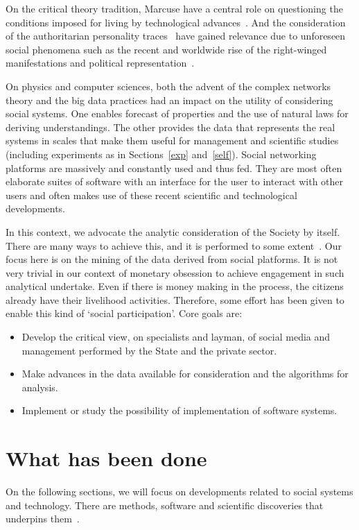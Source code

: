 \documentclass[letterpaper,10pt]{article}
\begin{document}
On the critical theory tradition,
Marcuse have a central role on
questioning the conditions
imposed for living by technological advances~\cite{m1,m2,m3,m4}.
And the consideration of the authoritarian personality traces~\cite{au}
have gained relevance due to unforeseen social phenomena
such as the recent and worldwide rise of the right-winged manifestations
and political representation~\cite{rise,rise2}.

On physics and computer sciences,
both the advent of the complex networks
theory and the big data practices
had an impact on the utility of considering
social systems.
One enables forecast of properties
and the use of natural laws for deriving understandings.
The other provides the data that represents the real systems
in scales that make them useful for management and
scientific studies (including experiments as in Sections~\ref{exp} and~\ref{self}).
Social networking platforms are massively and constantly used and thus fed.
They are most often elaborate suites of software with
an interface for the user to interact with other users
and often makes use of these recent scientific and technological
developments.\cite{tese}

In this context,
we advocate the analytic consideration
of the Society by itself.
There are many ways to achieve this,
and it is performed to some extent~\cite{scriptLattes,losd,p5,an}.
Our focus here is on the mining of the data
derived from social platforms.
It is not very trivial in our context
of monetary obsession to achieve engagement
in such analytical undertake.
Even if there is money making in the process,
the citizens already have their livelihood activities.
Therefore, some effort has been given to
enable this kind of `social participation'.
Core goals are:
\begin{itemize}
	\item Develop the critical view, on specialists and layman,
		of social media and
		management performed by the State and the private sector.
	\item Make advances in the data available for consideration
		and the algorithms for analysis.
	\item Implement or study the possibility of implementation
		of software systems.
\end{itemize}

\section{What has been done}
On the following sections, we will focus on
developments related to social systems and technology.
There are methods, software and scientific discoveries
that underpins them~\cite{stab,tese,kolm}.
\end{document}
